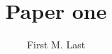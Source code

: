 \documentclass[11pt, titlepage]{article}
\title{Paper one}
\author{First M. Last}
\date{2016
  \vfill
  \singlespacing
  \begin{center}
    Pre-print of paper published in {\itshape Journal of Academic
      Studies and Work}, 45(2), 30--45.
  \end{center}}
\begin{document}
\maketitle

\begin{abstract}
 \lipsum[1]
\end{abstract}

\clearpage

\lipsum[2-50]

\end{document}
